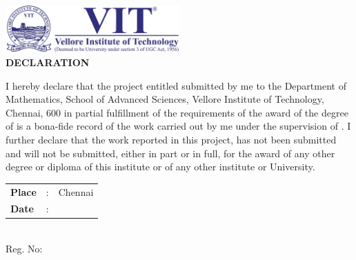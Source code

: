 \thispagestyle{plain}

\vspace*{-3\baselineskip}
\begin{center}
	\includegraphics[width=0.5\textwidth]{img/vitlogo}\\[0.3cm]
	
{\Large \bf DECLARATION}\\[0.75cm]
\end{center}


I hereby declare that the project entitled 
{\bf \printtitle} 
submitted by me to the Department of Mathematics, School of Advanced Sciences, Vellore Institute of Technology, Chennai, 600 
in partial fulfillment of the requirements of the award of the degree of {\bf \theprogrammeLongName} 
is a bona-fide record of the work  
carried out by me under the supervision of {\bf \theguide}. 
I further declare that 
the work reported in this project, has not been submitted and will not be submitted,
either in part or in full, for the award of any other degree or diploma of this
institute or of any other institute or University.

%

%
%

\vspace{3\baselineskip}

\begin{minipage}{.5\textwidth}
	\raggedright
	\begin{tabular}{lcl}
		\textbf{Place}  & : & Chennai \\
		\textbf{Date} & : &
	\end{tabular}
\end{minipage}%
\begin{minipage}{.5\textwidth}
	\raggedleft
	\thestudent\\
	Reg. No: \theregno\\
\end{minipage}

\cleardoublepage

